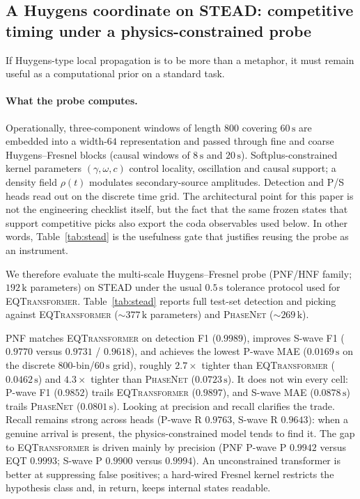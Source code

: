 \documentclass[twocolumn,10pt]{article}
\newcommand{\pnf}{\textsc{PNF}}
\newcommand{\hnf}{\textsc{HNF}}
\newcommand{\stead}{\textsc{STEAD}}
\newcommand{\eqt}{\textsc{EQTransformer}}
\newcommand{\pnet}{\textsc{PhaseNet}}
\begin{document}
\subsection*{A Huygens coordinate on STEAD: competitive timing under a physics-constrained probe}

If Huygens-type local propagation is to be more than a metaphor, it must remain
useful as a computational prior on a standard task.

\paragraph{What the probe computes.}
Operationally, three-component windows of length \(800\) covering
\(60\,\mathrm{s}\) are embedded into a width-\(64\) representation and passed
through fine and coarse Huygens--Fresnel blocks (causal windows of
\(8\,\mathrm{s}\) and \(20\,\mathrm{s}\)). Softplus-constrained kernel
parameters \((\gamma,\omega,c)\) control locality, oscillation and causal
support; a density field \(\rho(t)\) modulates secondary-source amplitudes.
Detection and P/S heads read out on the discrete time grid. The architectural
point for this paper is not the engineering checklist itself, but the fact that
the same frozen states that support competitive picks also export the coda
observables used below. In other words, Table~\ref{tab:stead} is the usefulness
gate that justifies reusing the probe as an instrument.

We therefore evaluate the
multi-scale Huygens--Fresnel probe (\pnf{}/\hnf{} family;
\(192\,\mathrm{k}\) parameters) on \stead{} under the usual
\(0.5\,\mathrm{s}\) tolerance protocol used for \eqt{}.
Table~\ref{tab:stead} reports full test-set detection and picking against
\eqt{} (\(\sim 377\,\mathrm{k}\) parameters) and \pnet{}
(\(\sim 269\,\mathrm{k}\)).

\pnf{} matches \eqt{} on detection F1 (\(0.9989\)), improves S-wave F1
(\(0.9770\) versus \(0.9731\) / \(0.9618\)), and achieves the lowest P-wave MAE
(\(0.0169\,\mathrm{s}\) on the discrete \(800\)-bin/\(60\,\mathrm{s}\) grid),
roughly \(2.7\times\) tighter than \eqt{} (\(0.0462\,\mathrm{s}\)) and
\(4.3\times\) tighter than \pnet{} (\(0.0723\,\mathrm{s}\)). It does not win
every cell: P-wave F1 (\(0.9852\)) trails \eqt{} (\(0.9897\)), and S-wave MAE
(\(0.0878\,\mathrm{s}\)) trails \pnet{} (\(0.0801\,\mathrm{s}\)). Looking at
precision and recall clarifies the trade. Recall remains strong across heads
(P-wave R \(0.9763\), S-wave R \(0.9643\)): when a genuine arrival is present,
the physics-constrained model tends to find it. The gap to \eqt{} is driven
mainly by precision (PNF P-wave P \(0.9942\) versus EQT \(0.9993\); S-wave P
\(0.9900\) versus \(0.9994\)). An unconstrained transformer is better at
suppressing false positives; a hard-wired Fresnel kernel restricts the
hypothesis class and, in return, keeps internal states readable.
\end{document}
